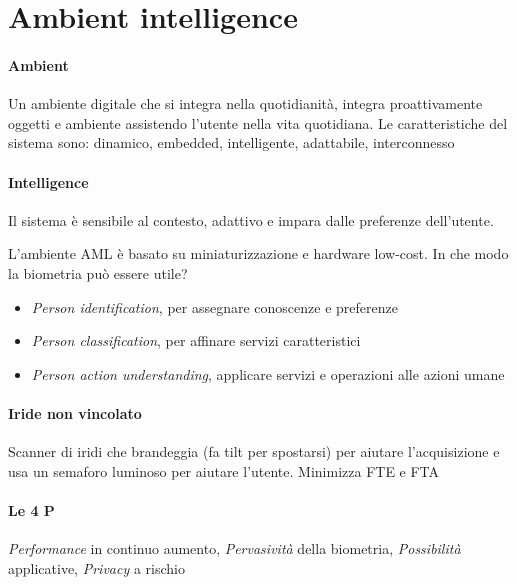 \section{Ambient intelligence}
\paragraph{Ambient}
Un ambiente digitale che si integra nella quotidianità, integra proattivamente oggetti e ambiente assistendo l’utente nella vita quotidiana. Le caratteristiche del sistema sono: dinamico, embedded, intelligente, adattabile, interconnesso

\paragraph{Intelligence} 
Il sistema è sensibile al contesto, adattivo e impara dalle preferenze dell’utente.

L’ambiente AML è basato su miniaturizzazione e hardware low-cost. In che modo la biometria può essere utile? \begin{itemize}
    \item \textit{Person identification}, per assegnare conoscenze e preferenze
    \item \textit{Person classification}, per affinare servizi caratteristici
    \item \textit{Person action understanding}, applicare servizi e operazioni alle azioni umane
\end{itemize}

\paragraph{Iride non vincolato}
Scanner di iridi che brandeggia (fa tilt per spostarsi) per aiutare l’acquisizione e usa un semaforo luminoso per aiutare l’utente. Minimizza FTE e FTA

\paragraph{Le 4 P}
\textit{Performance} in continuo aumento, \textit{Pervasività} della biometria, \textit{Possibilità} applicative, \textit{Privacy} a rischio